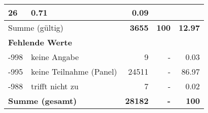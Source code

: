 \begin{longtable}{lXrrr}
       \num{26} &
       \num[round-mode=places,round-precision=2]{0,71} &
         \num[round-mode=places,round-precision=2]{0,09} \\
     \midrule
     \multicolumn{2}{l}{Summe (gültig)} &
       \textbf{\num{3655}} &
     \textbf{100} &
       \textbf{\num[round-mode=places,round-precision=2]{12,97}} \\
     \multicolumn{5}{l}{\textbf{Fehlende Werte}}\\
       -998 &
       keine Angabe &
         \num{9} &
        - &
         \num[round-mode=places,round-precision=2]{0,03} \\
       -995 &
       keine Teilnahme (Panel) &
         \num{24511} &
        - &
         \num[round-mode=places,round-precision=2]{86,97} \\
       -988 &
       trifft nicht zu &
         \num{7} &
        - &
         \num[round-mode=places,round-precision=2]{0,02} \\
     \midrule
     \multicolumn{2}{l}{\textbf{Summe (gesamt)}} &
          \textbf{\num{28182}} &
        \textbf{-} &
        \textbf{100} \\
     \bottomrule
     \end{longtable}
     

